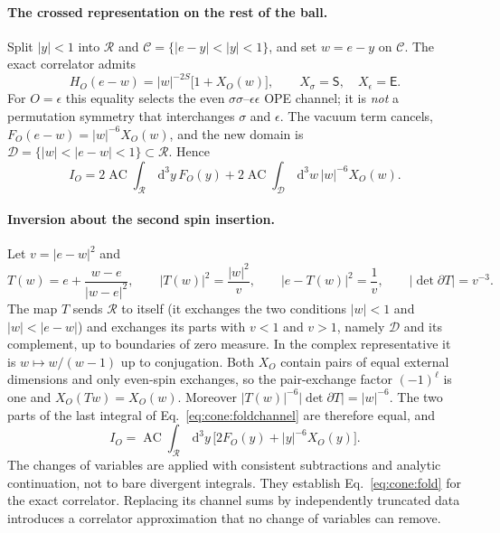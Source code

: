 \documentclass[11pt,a4paper]{article}
\numberwithin{equation}{section}
\newcommand{\dd}{\,\mathrm d}
\newcommand{\AC}{\operatorname{AC}}
\begin{document}
\paragraph{The crossed representation on the rest of the ball.} Split $|y|<1$ into $\mathcal R$ and
$\mathcal C=\{|e-y|<|y|<1\}$, and set $w=e-y$ on $\mathcal C$. The exact correlator admits
\begin{equation}
 H_O(e-w)=|w|^{-2S}\bigl[1+X_O(w)\bigr],\qquad X_\sigma=\mathsf S,\quad X_\epsilon=\mathsf E .
\end{equation}
For $O=\epsilon$ this equality selects the even $\sigma\sigma$--$\epsilon\epsilon$ OPE channel; it is \emph{not} a
permutation symmetry that interchanges $\sigma$ and $\epsilon$. The vacuum term cancels, $F_O(e-w)=|w|^{-6}X_O(w)$, and
the new domain is $\mathcal D=\{|w|<|e-w|<1\}\subset\mathcal R$. Hence
\begin{equation}
 I_O=2\AC\!\int_{\mathcal R}\dd^3y\,F_O(y)+2\AC\!\int_{\mathcal D}\dd^3w\,|w|^{-6}X_O(w).
 \label{eq:cone:foldchannel}
\end{equation}

\paragraph{Inversion about the second spin insertion.} Let $v=|e-w|^2$ and
\begin{equation}
 T(w)=e+\frac{w-e}{|w-e|^2},\qquad |T(w)|^2=\frac{|w|^2}{v},\qquad |e-T(w)|^2=\frac1v,\qquad
 |\det\partial T|=v^{-3}.
\end{equation}
The map $T$ sends $\mathcal R$ to itself (it exchanges the two conditions $|w|<1$ and $|w|<|e-w|$) and exchanges its
parts with $v<1$ and $v>1$, namely $\mathcal D$ and its complement, up to boundaries of zero measure. In the complex
representative it is $w\mapsto w/(w-1)$ up to conjugation. Both $X_O$ contain pairs of equal external dimensions and
only even-spin exchanges, so the pair-exchange factor $(-1)^\ell$ is one and $X_O(Tw)=X_O(w)$. Moreover
$|T(w)|^{-6}|\det\partial T|=|w|^{-6}$. The two parts of the last integral of Eq.~\eqref{eq:cone:foldchannel} are
therefore equal, and
\begin{equation}
 \boxed{\,I_O=\AC\!\int_{\mathcal R}\dd^3y\,\bigl[2F_O(y)+|y|^{-6}X_O(y)\bigr].\,}
 \label{eq:cone:fold}
\end{equation}
The changes of variables are applied with consistent subtractions and analytic continuation, not to bare divergent
integrals. They establish Eq.~\eqref{eq:cone:fold} for the exact correlator. Replacing its channel sums by
independently truncated data introduces a correlator approximation that no change of variables can remove.
\end{document}
